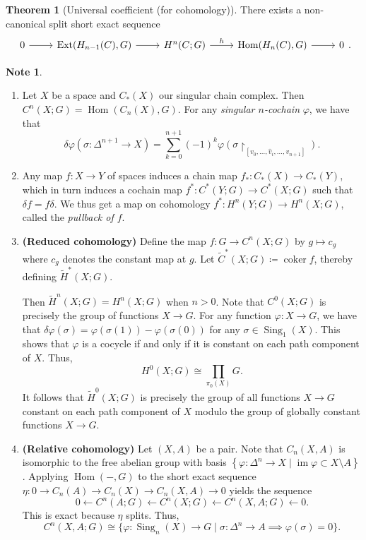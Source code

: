 \documentclass[10pt,letterpaper,cm]{nupset}
\theoremstyle{definition}
\newtheorem{note}[definition]{Note}
\theoremstyle{theorem}
\newtheorem{theorem}[definition]{Theorem}
\theoremstyle{remark}
\newcommand{\1}{\mathbb{1}}
\newcommand{\0}{\vec 0}
\newcommand{\from}{\longleftarrow}
\DeclareMathOperator{\im}{im}
\DeclareMathOperator{\ext}{Ext}
\DeclareMathOperator{\Hom}{Hom}
\DeclareMathOperator{\coker}{coker}
\DeclareMathOperator{\sing}{Sing}
\begin{document}
\begin{theorem}[Universal coefficient (for cohomology)]
There exists a non-canonical split short exact sequence $$\begin{tikzcd}
0 \arrow[r] & \ext(H_{n-1}(C), G) \arrow[r] & H^n(C; G) \arrow[r, "h"] & \Hom(H_n(C), G) \arrow[r] & 0
\end{tikzcd}     .$$
\end{theorem}

\begin{note} $ $
\begin{enumerate}
\item Let $X$ be a space and $C_{\ast}(X)$ our singular chain complex. Then $C^n(X; G) = \Hom(C_n(X), G)$. For any \textit{singular $n$-cochain} $\varphi$, we have that $$\delta{\varphi}(\sigma : \Delta^{n+1} \to X) = \sum_{k=0}^{n+1}({-1})^k\varphi(\sigma \restriction_{ [v_0, \ldots, \hat{v}_i, \ldots, v_{n+1}]}).$$ 
\item Any map $f: X \to Y$ of spaces induces a chain map $f_{\ast} : C_{\ast}(X) \to C_{\ast}(Y)$, which in turn induces a cochain map $f^{\ast} : C^{\ast}(Y; G) \to C^{\ast}(X; G)$ such that $\delta{f} = f{\delta}$.  We thus get a map on cohomology $f^{\ast} : H^n(Y; G) \to H^n(X;G)$, called the \textit{pullback of $f$}.
\item  {\textbf{(Reduced cohomology)}} Define the map $f : G \to C^n(X; G)$ by $g \mapsto c_g$ where $c_g$ denotes the constant map at $g$. Let $\widetilde{C}^{\ast}(X; G) \coloneqq  \coker{f}$, thereby defining $\widetilde{H}^{\ast}(X; G)$.

Then $\widetilde{H}^n(X; G) = H^n(X; G)$ when $n>0$. Note that $C^0(X; G)$ is precisely the group of functions $X \to G$. For any function $\varphi : X \to G$, we have that $\delta{\varphi}(\sigma) = \varphi(\sigma(1)) - \varphi(\sigma(0))$ for any $\sigma \in \sing_1(X)$. This shows that $\varphi$ is a cocycle if and only if it is constant on each path component of $X$. Thus, $$H^0(X; G) \cong \prod_{\pi_0(X)} G.$$ It follows that $\widetilde{H}^0(X; G)$ is precisely the group of all functions $X \to G$ constant on each path component of $X$ modulo the group of globally constant functions $X \to G$.
\item  {\textbf{(Relative cohomology)}} Let $\left(X, A\right)$ be a pair.  Note that $C_n(X,A)$ is isomorphic to the free abelian group with basis $\left\{\varphi : \Delta^n \to X \mid \im{\varphi} \subset X \setminus A\right\}$. Applying $\Hom({-}, G)$ to the short exact sequence $\eta: 0 \to C_n(A) \to C_n(X) \to C_n(X,A) \to 0$ yields the sequence $$ 0 \from C^n(A; G) \from C^n(X; G) \from C^n(X, A; G) \from 0  .$$ This is exact because $\eta$ splits. Thus, $$ C^n(X, A; G) \cong \{\varphi : \sing_n(X) \to G \mid \sigma : \Delta^n \to A \implies \varphi(\sigma) = 0\}.$$
\end{enumerate}
\end{note}
\end{document}
